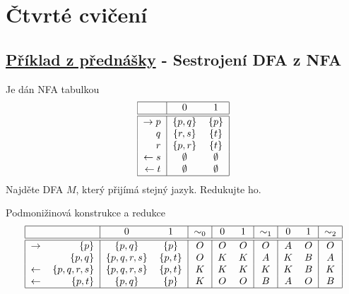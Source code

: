 \section{Čtvrté cvičení}

\subsection{\href{https://youtu.be/Hbi2ao1mFBc?list=PLQL6z4JeTTQkLuzI78OTnfYBclE1g0UjS&t=1143}{Příklad z přednášky} 
- Sestrojení DFA z NFA}
Je dán NFA tabulkou
\[
    \begin{tabular}{|r|c c|}
        \hline
        & $0$ & $1$ \\ \hline \hline
        $\rightarrow p$& $\bc{p,q}$ & $\bc{p}$ \\
        $q$            & $\bc{r,s}$ & $\bc{t}$ \\
        $r$            & $\bc{p,r}$ & $\bc{t}$ \\
        $\leftarrow s$ & $\emptyset$ & $\emptyset$ \\
        $\leftarrow t$ & $\emptyset$ & $\emptyset$ \\
        \hline
    \end{tabular}
\]
Najděte DFA $M$, který přijímá stejný jazyk. Redukujte ho.

Podmonižinová konstrukce a redukce
\[
    \begin{tabular}{|r r|c c|c|c c|c|c c|c|c c|c|}
        \hline
        & $ $ & $0$ & $1$ & $\sim_0$ & $0$ & $1$ & $\sim_1$ & $0$ & $1$ & $\sim_2$ \\ \hline \hline
        $\rightarrow$  &$\bc{p}$       & $\bc{p,q}$     & $\bc{p}$   & $O$ & $O$ & $O$ & $O$ & $A$ & $O$ & $O$ \\
                       &$\bc{p,q}$     & $\bc{p,q,r,s}$ & $\bc{p,t}$ & $O$ & $K$ & $K$ & $A$ & $K$ & $B$ & $A$ \\
        $\leftarrow$   &$\bc{p,q,r,s}$ & $\bc{p,q,r,s}$ & $\bc{p,t}$ & $K$ & $K$ & $K$ & $K$ & $K$ & $B$ & $K$ \\
        $\leftarrow$   &$\bc{p,t}$     & $\bc{p,q}$     & $\bc{p}$   & $K$ & $O$ & $O$ & $B$ & $A$ & $O$ & $B$ \\
        \hline
    \end{tabular}
\]
\begin{figure}[H]
    \centering
\end{figure}

